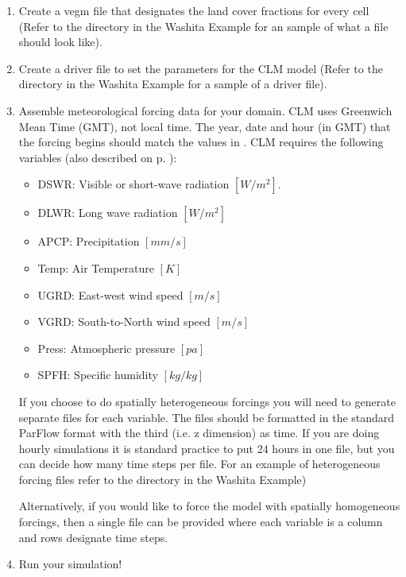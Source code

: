 \begin{enumerate}
   \item Create a  vegm file that designates the land cover fractions for every 
   cell (Refer to the  directory in the Washita Example for an sample of 
   what a  file should look like).

   \item Create a  driver file to set the parameters for the CLM model (Refer to the 
    directory in the Washita Example for a sample of a  driver file).

   \item Assemble meteorological forcing data for your domain. CLM uses Greenwich Mean Time (GMT), not local time. The year, date and hour (in GMT) that the forcing begins should match the values in .  CLM requires the following 
   variables (also described on p. \pageref{clm_forcing}): 
   
   \begin{itemize}
		\item DSWR: Visible or short-wave radiation $[W/m^2]$.
		\item DLWR: Long wave radiation $[W/m^2]$
		\item APCP: Precipitation $[mm/s]$
		\item Temp: Air Temperature $[K]$
		\item UGRD: East-west wind speed $[m/s]$
                \item VGRD: South-to-North wind speed $[m/s]$
		\item Press: Atmospheric pressure $[pa]$
		\item SPFH:	Specific humidity $[kg/kg]$
	\end{itemize}
	
	If you choose to do spatially heterogeneous forcings you will need to generate separate 
	files for each variable. The files should be formatted in the standard ParFlow format 
	with the third (i.e. z dimension) as time. If you are doing hourly simulations it is 
	standard practice to put 24 hours in one file, but you can decide how many time steps per 
	file. For an example of heterogeneous forcing files refer to the  directory
	in the Washita Example)

	Alternatively, if you would like to force the model with spatially homogeneous forcings, 
	then a single file can be provided where each variable is a column and rows designate 
	time steps. 

   \item Run your simulation!
   
\end{enumerate}

